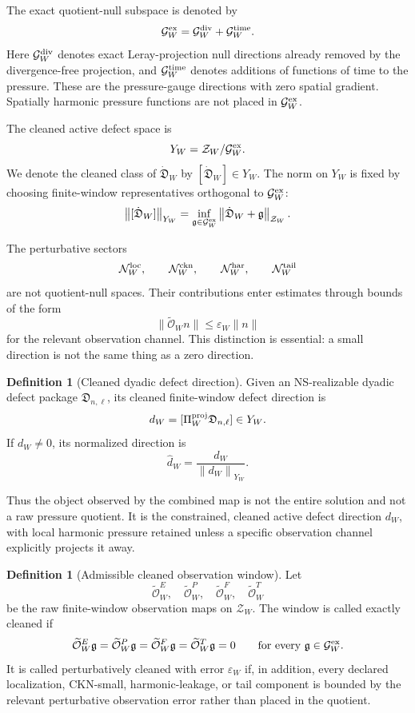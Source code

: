 \documentclass[11pt]{article}
\numberwithin{equation}{section}
\theoremstyle{plain}
\theoremstyle{definition}
\newtheorem{definition}[theorem]{Definition}
\theoremstyle{remark}
\newcommand{\eps}{\varepsilon}
\newcommand{\norm}[2]{\left\|#1\right\|_{#2}}
\newcommand{\calG}{\mathcal G}
\newcommand{\calN}{\mathcal N}
\newcommand{\calO}{\mathcal O}
\newcommand{\calZ}{\mathcal Z}
\newcommand{\frakD}{\mathfrak D}
\begin{document}
The exact quotient-null subspace is denoted by
\[
  \calG_W^{\rm ex}
  =
  \calG_W^{\rm div}
  +
  \calG_W^{\rm time}.
\]
Here \(\calG_W^{\rm div}\) denotes exact Leray-projection null directions already removed by the divergence-free projection, and \(\calG_W^{\rm time}\) denotes additions of functions of time to the pressure.  These are the pressure-gauge directions with zero spatial gradient.  Spatially harmonic pressure functions are not placed in \(\calG_W^{\rm ex}\).

The cleaned active defect space is
\begin{equation}
  Y_W=\calZ_W/\calG_W^{\rm ex}.
  \label{eq:active-defect-space}
\end{equation}
We denote the cleaned class of \(\dot{\frakD}_W\) by \([\dot{\frakD}_W]\in Y_W\).  The norm on \(Y_W\) is fixed by choosing finite-window representatives orthogonal to \(\calG_W^{\rm ex}\):
\[
  \norm{[\dot{\frakD}_W]}{Y_W}
  =
  \inf_{\mathfrak g\in\calG_W^{\rm ex}}
  \norm{\dot{\frakD}_W+\mathfrak g}{\calZ_W}.
\]

The perturbative sectors
\[
  \calN_W^{\rm loc},\qquad
  \calN_W^{\rm ckn},\qquad
  \calN_W^{\rm har},\qquad
  \calN_W^{\rm tail}
\]
are not quotient-null spaces.  Their contributions enter estimates through bounds of the form
\[
  \|\widetilde{\calO}_W n\|
  \le
  \eps_W\|n\|
\]
for the relevant observation channel.  This distinction is essential: a small direction is not the same thing as a zero direction.

\begin{definition}[Cleaned dyadic defect direction]
Given an NS-realizable dyadic defect package \(\frakD_{n,\ell}\), its cleaned finite-window defect direction is
\[
  d_W=[\Pi_W^{\rm proj}\frakD_{n,\ell}]\in Y_W.
\]
If \(d_W\ne0\), its normalized direction is
\[
  \widehat d_W=\frac{d_W}{\norm{d_W}{Y_W}}.
\]
\end{definition}

Thus the object observed by the combined map is not the entire solution and not a raw pressure quotient.  It is the constrained, cleaned active defect direction \(d_W\), with local harmonic pressure retained unless a specific observation channel explicitly projects it away.

\begin{definition}[Admissible cleaned observation window]
\label{def:admissible-cleaned-window}
Let
\[
  \widetilde{\calO}^{E}_W,
  \quad
  \widetilde{\calO}^{P}_W,
  \quad
  \widetilde{\calO}^{F}_W,
  \quad
  \widetilde{\calO}^{T}_W
\]
be the raw finite-window observation maps on \(\calZ_W\).  The window is called exactly cleaned if
\[
  \widetilde{\calO}^{E}_W\mathfrak g
  =
  \widetilde{\calO}^{P}_W\mathfrak g
  =
  \widetilde{\calO}^{F}_W\mathfrak g
  =
  \widetilde{\calO}^{T}_W\mathfrak g
  =0
  \qquad
  \text{for every }\mathfrak g\in\calG_W^{\rm ex}.
\]
It is called perturbatively cleaned with error \(\eps_W\) if, in addition, every declared localization, CKN-small, harmonic-leakage, or tail component is bounded by the relevant perturbative observation error rather than placed in the quotient.
\end{definition}
\end{document}
